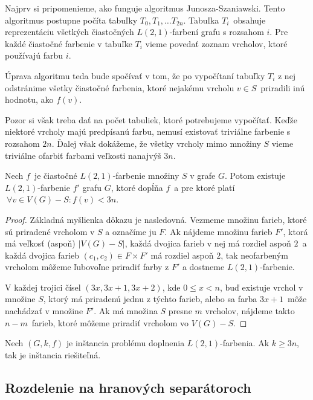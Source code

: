 Najprv si pripomenieme, ako funguje algoritmus Junosza-Szaniawski.
Tento algoritmus postupne počíta tabuľky $T_0, T_1, \ldots T_{2n}$.
Tabuľka $T_i$ obsahuje reprezentáciu všetkých čiastočných $L(2,1)$-farbení grafu s rozsahom $i$. Pre každé
čiastočné farbenie v tabuľke $T_i$ vieme povedať zoznam vrcholov, ktoré používajú farbu $i$.

Úprava algoritmu teda bude spočívať v tom, že po vypočítaní tabuľky $T_i$ z nej odstránime
všetky čiastočné farbenia, ktoré nejakému vrcholu $v \in S$ priradili inú hodnotu, ako $f(v)$.

Pozor si však treba dať na počet tabuliek, ktoré potrebujeme vypočítať. Keďže niektoré vrcholy
majú predpísanú farbu, nemusí existovať triviálne farbenie s rozsahom $2n$. Ďalej však dokážeme,
že všetky vrcholy mimo množiny $S$ vieme triviálne ofarbiť farbami veľkosti nanajvýš $3n$.

\begin{lema}
    Nech $f$ je čiastočné $L(2,1)$-farbenie množiny $S$ v grafe $G$. Potom existuje
    $L(2,1)$-farbenie $f'$ grafu $G$, ktoré dopĺňa $f$ a pre ktoré platí $\ \forall v \in V(G) - S: f(v) < 3n$.
\end{lema}
\begin{proof}
    Základná myšlienka dôkazu je nasledovná. Vezmeme množinu farieb, ktoré sú priradené vrcholom v $S$
    a označíme ju $F$. Ak nájdeme množinu farieb $F'$, ktorá má veľkosť (aspoň) $|V(G) - S|$,
    každá dvojica farieb v nej má rozdiel aspoň $2$ a každá dvojica farieb $(c_1, c_2) \in F \times F'$ má
    rozdiel aspoň $2$, tak neofarbeným vrcholom môžeme ľubovoľne priradiť farby z $F'$ a dostneme
    $L(2,1)$-farbenie.

    V každej trojici čísel $(3x, 3x + 1, 3x+2)$, kde $0 \leq x < n$, buď existuje vrchol
    v množine $S$, ktorý má priradenú jednu z týchto farieb, alebo sa farba $3x + 1$ môže nachádzať v
    množine $F'$. Ak má množina $S$ presne $m$ vrcholov, nájdeme takto $n - m$ farieb, ktoré
    môžeme priradiť vrcholom vo $V(G) - S$.
\end{proof}
\begin{dosl}
    Nech $(G, k, f)$ je inštancia problému doplnenia $L(2,1)$-farbenia. Ak $k \ge 3n$, tak
    je inštancia riešiteľná.
\end{dosl}

\subsection{Rozdelenie na hranových separátoroch}


